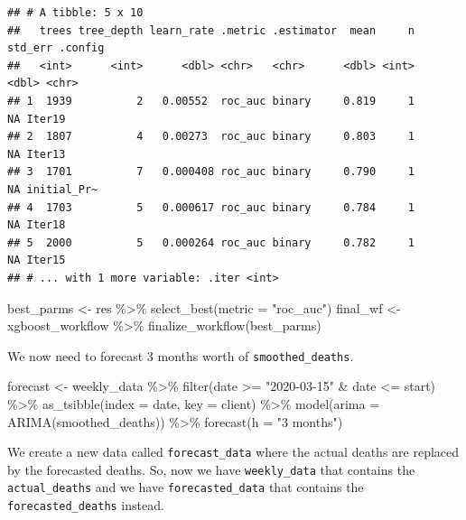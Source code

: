 \documentclass[
]{article}
\newenvironment{Shaded}{\begin{snugshade}}{\end{snugshade}}
\newcommand{\AttributeTok}[1]{\textcolor[rgb]{0.77,0.63,0.00}{#1}}
\newcommand{\FunctionTok}[1]{\textcolor[rgb]{0.00,0.00,0.00}{#1}}
\newcommand{\NormalTok}[1]{#1}
\newcommand{\OtherTok}[1]{\textcolor[rgb]{0.56,0.35,0.01}{#1}}
\newcommand{\SpecialCharTok}[1]{\textcolor[rgb]{0.00,0.00,0.00}{#1}}
\newcommand{\StringTok}[1]{\textcolor[rgb]{0.31,0.60,0.02}{#1}}
\begin{document}
\begin{verbatim}
## # A tibble: 5 x 10
##   trees tree_depth learn_rate .metric .estimator  mean     n std_err .config    
##   <int>      <int>      <dbl> <chr>   <chr>      <dbl> <int>   <dbl> <chr>      
## 1  1939          2   0.00552  roc_auc binary     0.819     1      NA Iter19     
## 2  1807          4   0.00273  roc_auc binary     0.803     1      NA Iter13     
## 3  1701          7   0.000408 roc_auc binary     0.790     1      NA initial_Pr~
## 4  1703          5   0.000617 roc_auc binary     0.784     1      NA Iter18     
## 5  2000          5   0.000264 roc_auc binary     0.782     1      NA Iter15     
## # ... with 1 more variable: .iter <int>
\end{verbatim}

\begin{Shaded}
\begin{Highlighting}[]
\NormalTok{best\_parms }\OtherTok{\textless{}{-}}\NormalTok{ res }\SpecialCharTok{\%\textgreater{}\%} \FunctionTok{select\_best}\NormalTok{(}\AttributeTok{metric =} \StringTok{"roc\_auc"}\NormalTok{)}
\NormalTok{final\_wf }\OtherTok{\textless{}{-}}\NormalTok{ xgboost\_workflow }\SpecialCharTok{\%\textgreater{}\%} \FunctionTok{finalize\_workflow}\NormalTok{(best\_parms)}
\end{Highlighting}
\end{Shaded}

We now need to forecast 3 months worth of \texttt{smoothed\_deaths}.

\begin{Shaded}
\begin{Highlighting}[]
\NormalTok{forecast }\OtherTok{\textless{}{-}}
\NormalTok{  weekly\_data }\SpecialCharTok{\%\textgreater{}\%}
  \FunctionTok{filter}\NormalTok{(date }\SpecialCharTok{\textgreater{}=} \StringTok{"2020{-}03{-}15"} \SpecialCharTok{\&}\NormalTok{ date }\SpecialCharTok{\textless{}=}\NormalTok{ start) }\SpecialCharTok{\%\textgreater{}\%}
  \FunctionTok{as\_tsibble}\NormalTok{(}\AttributeTok{index =}\NormalTok{ date, }\AttributeTok{key =}\NormalTok{ client) }\SpecialCharTok{\%\textgreater{}\%}
  \FunctionTok{model}\NormalTok{(}\AttributeTok{arima =} \FunctionTok{ARIMA}\NormalTok{(smoothed\_deaths)) }\SpecialCharTok{\%\textgreater{}\%}
  \FunctionTok{forecast}\NormalTok{(}\AttributeTok{h =} \StringTok{"3 months"}\NormalTok{)}
\end{Highlighting}
\end{Shaded}

We create a new data called \texttt{forecast\_data} where the actual
deaths are replaced by the forecasted deaths. So, now we have
\texttt{weekly\_data} that contains the \texttt{actual\_deaths} and we
have \texttt{forecasted\_data} that contains the
\texttt{forecasted\_deaths} instead.
\end{document}
